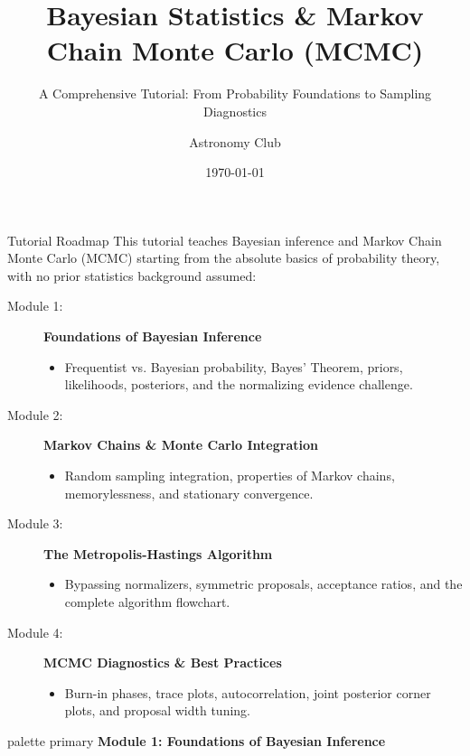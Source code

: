 \documentclass[9pt]{beamer}
\title{Bayesian Statistics \& Markov Chain Monte Carlo (MCMC)}
\subtitle{A Comprehensive Tutorial: From Probability Foundations to Sampling Diagnostics}
\author{Astronomy Club}
\date{\today}
\begin{document}
\maketitle

\begin{frame}{Tutorial Roadmap}
  This tutorial teaches Bayesian inference and Markov Chain Monte Carlo (MCMC) starting from the absolute basics of probability theory, with no prior statistics background assumed:
  \begin{description}
    \item[Module 1:] \textbf{Foundations of Bayesian Inference}
      \begin{itemize}
        \item Frequentist vs. Bayesian probability, Bayes' Theorem, priors, likelihoods, posteriors, and the normalizing evidence challenge.
      \end{itemize}
    \item[Module 2:] \textbf{Markov Chains \& Monte Carlo Integration}
      \begin{itemize}
        \item Random sampling integration, properties of Markov chains, memorylessness, and stationary convergence.
      \end{itemize}
    \item[Module 3:] \textbf{The Metropolis-Hastings Algorithm}
      \begin{itemize}
        \item Bypassing normalizers, symmetric proposals, acceptance ratios, and the complete algorithm flowchart.
      \end{itemize}
    \item[Module 4:] \textbf{MCMC Diagnostics \& Best Practices}
      \begin{itemize}
        \item Burn-in phases, trace plots, autocorrelation, joint posterior corner plots, and proposal width tuning.
      \end{itemize}
  \end{description}
\end{frame}

\begin{frame}[plain]
  \vfill
  \centering
  \begin{beamercolorbox}[sep=8pt,center,shadow=true,rounded=true]{palette primary}
    \textbf{Module 1: Foundations of Bayesian Inference}
  \end{beamercolorbox}
  \vfill
\end{frame}
\end{document}
